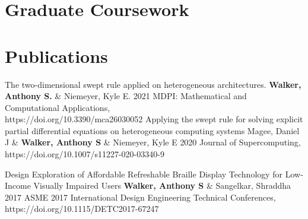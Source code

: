 \documentclass[%
               doublesided,
               paper=a4,
               fontsize=10pt
              ]{my-resume}
\begin{document}
{    
    
    \section[\faPaperclip]{Graduate Coursework}
    
    \section[\faFile]{Publications}
    \publication
	{The two-dimensional swept rule applied on heterogeneous architectures.} %
	{\textbf{Walker, Anthony S.} \& Niemeyer,  Kyle E.} %
	{2021} %
	{MDPI: Mathematical and Computational Applications,\\ https://doi.org/10.3390/mca26030052} %
	{} %
	\publication
	{Applying the swept rule for solving explicit partial differential equations on heterogeneous computing systems} %
	{Magee, Daniel J \& \textbf{Walker, Anthony S} \& Niemeyer, Kyle E} %
	{2020} %
	{Journal of Supercomputing,\\ https://doi.org/10.1007/s11227-020-03340-9} %
	{} %

    \publication
	{Design Exploration of Affordable Refreshable Braille Display Technology for Low-Income Visually Impaired Users} %
	{\textbf{Walker, Anthony S} \& Sangelkar, Shraddha} %
	{2017} %
	{ASME 2017 International Design Engineering Technical Conferences, https://doi.org/10.1115/DETC2017-67247} %
	{} %
}


\makebody
\end{document}
